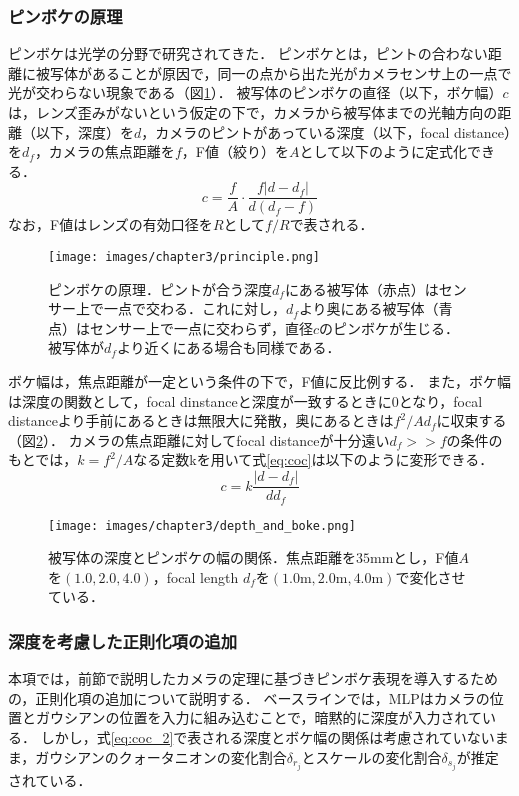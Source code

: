 \subsubsection{ピンボケの原理}\label{subsubsec:principle_of_blur}
ピンボケは光学の分野で研究されてきた\cite{optics}．
ピンボケとは，ピントの合わない距離に被写体があることが原因で，同一の点から出た光がカメラセンサ上の一点で光が交わらない現象である（図\ref{fig:principle}）．
被写体のピンボケの直径（以下，ボケ幅）$c$は，レンズ歪みがないという仮定の下で，カメラから被写体までの光軸方向の距離（以下，深度）を$d$，カメラのピントがあっている深度（以下，focal distance）を$d_f$，カメラの焦点距離を$f$，F値（絞り）を$A$として以下のように定式化できる．
\begin{equation}
	c = \frac{f}{A} \cdot \frac{f\left|d-d_f\right|}{d(d_f-f)}
	\label{eq:coc}
\end{equation}
なお，F値はレンズの有効口径を$R$として$f/R$で表される．\par
\begin{figure}[h]
	\centering
	\texttt{[image: images/chapter3/principle.png]}
	\caption[ピンボケの原理]{ピンボケの原理．ピントが合う深度$d_f$にある被写体（赤点）はセンサー上で一点で交わる．これに対し，$d_f$より奥にある被写体（青点）はセンサー上で一点に交わらず，直径$c$のピンボケが生じる．被写体が$d_f$より近くにある場合も同様である．}
	\label{fig:principle}
\end{figure}
ボケ幅は，焦点距離が一定という条件の下で，F値に反比例する．
また，ボケ幅は深度の関数として，focal dinstanceと深度が一致するときに0となり，focal distanceより手前にあるときは無限大に発散，奥にあるときは$f^2/{Ad_f}$に収束する（図\ref{fig:depth_and_boke}）．
カメラの焦点距離に対してfocal distanceが十分遠い$d_f>>f$の条件のもとでは，$k=f^2/A$なる定数kを用いて式\ref{eq:coc}は以下のように変形できる．
\begin{equation}
	c = k \frac{\left|d-d_f\right|}{dd_f}
	\label{eq:coc_2}
\end{equation}
\begin{figure}[h]
	\centering
	\texttt{[image: images/chapter3/depth\_and\_boke.png]}
	\caption[被写体の深度とピンボケの幅の関係]{被写体の深度とピンボケの幅の関係．焦点距離を$35 \text{mm}$とし，F値$A$を$(1.0, 2.0, 4.0)$，focal length $d_f$を$(1.0 \text{m}, 2.0 \text{m}, 4.0 \text{m})$で変化させている．}
	\label{fig:depth_and_boke}
\end{figure}
\subsubsection{深度を考慮した正則化項の追加}\label{subsubsec:add_regularization_term}
本項では，前節で説明したカメラの定理に基づきピンボケ表現を導入するための，正則化項の追加について説明する．
ベースラインでは，MLPはカメラの位置とガウシアンの位置を入力に組み込むことで，暗黙的に深度が入力されている．
しかし，式\ref{eq:coc_2}で表される深度とボケ幅の関係は考慮されていないまま，ガウシアンのクォータニオンの変化割合$\delta_{r_j}$とスケールの変化割合$\delta_{s_j}$が推定されている．\par

